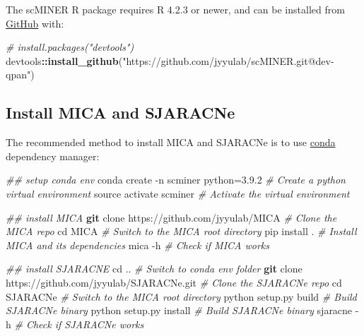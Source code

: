 \documentclass[
  12pt,
]{book}
\newenvironment{Shaded}{\begin{snugshade}}{\end{snugshade}}
\newcommand{\AttributeTok}[1]{\textcolor[rgb]{0.13,0.29,0.53}{#1}}
\newcommand{\BuiltInTok}[1]{#1}
\newcommand{\CommentTok}[1]{\textcolor[rgb]{0.56,0.35,0.01}{\textit{#1}}}
\newcommand{\ExtensionTok}[1]{#1}
\newcommand{\FunctionTok}[1]{\textcolor[rgb]{0.13,0.29,0.53}{\textbf{#1}}}
\newcommand{\NormalTok}[1]{#1}
\newcommand{\SpecialCharTok}[1]{\textcolor[rgb]{0.81,0.36,0.00}{\textbf{#1}}}
\newcommand{\StringTok}[1]{\textcolor[rgb]{0.31,0.60,0.02}{#1}}
\begin{document}
The scMINER R package requires R 4.2.3 or newer, and can be installed from \href{https://github.com/}{GitHub} with:

\begin{Shaded}
\begin{Highlighting}[]
\CommentTok{\# install.packages("devtools")}
\NormalTok{devtools}\SpecialCharTok{::}\FunctionTok{install\_github}\NormalTok{(}\StringTok{"https://github.com/jyyulab/scMINER.git@dev{-}qpan"}\NormalTok{)}
\end{Highlighting}
\end{Shaded}

\subsection*{Install MICA and SJARACNe}\label{install-mica-and-sjaracne}

The recommended method to install MICA and SJARACNe is to use \href{https://conda.io/projects/conda/en/latest/}{conda} dependency manager:

\begin{Shaded}
\begin{Highlighting}[]
\CommentTok{\#\# setup conda env}
\ExtensionTok{conda}\NormalTok{ create }\AttributeTok{{-}n}\NormalTok{ scminer python=3.9.2                }\CommentTok{\# Create a python virtual environment}
\BuiltInTok{source}\NormalTok{ activate scminer                             }\CommentTok{\# Activate the virtual environment}

\CommentTok{\#\# install MICA}
\FunctionTok{git}\NormalTok{ clone https://github.com/jyyulab/MICA           }\CommentTok{\# Clone the MICA repo}
\BuiltInTok{cd}\NormalTok{ MICA                                             }\CommentTok{\# Switch to the MICA root directory}
\ExtensionTok{pip}\NormalTok{ install .                                       }\CommentTok{\# Install MICA and its dependencies}
\ExtensionTok{mica} \AttributeTok{{-}h}                                             \CommentTok{\# Check if MICA works}

\CommentTok{\#\# install SJARACNE}
\BuiltInTok{cd}\NormalTok{ ..                                               }\CommentTok{\# Switch to conda env folder}
\FunctionTok{git}\NormalTok{ clone https://github.com/jyyulab/SJARACNe.git   }\CommentTok{\# Clone the SJARACNe repo}
\BuiltInTok{cd}\NormalTok{ SJARACNe                                         }\CommentTok{\# Switch to the MICA root directory}
\ExtensionTok{python}\NormalTok{ setup.py build                               }\CommentTok{\# Build SJARACNe binary}
\ExtensionTok{python}\NormalTok{ setup.py install                             }\CommentTok{\# Build SJARACNe binary}
\ExtensionTok{sjaracne} \AttributeTok{{-}h}                                         \CommentTok{\# Check if SJARACNe works}
\end{Highlighting}
\end{Shaded}
\end{document}
